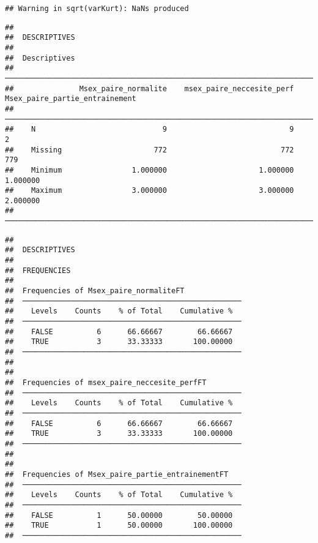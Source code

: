 \documentclass[
]{article}
\begin{document}
\begin{verbatim}
## Warning in sqrt(varKurt): NaNs produced
\end{verbatim}

\begin{verbatim}
## 
##  DESCRIPTIVES
## 
##  Descriptives                                                                                       
##  ────────────────────────────────────────────────────────────────────────────────────────────────── 
##               Msex_paire_normalite    msex_paire_neccesite_perf    Msex_paire_partie_entrainement   
##  ────────────────────────────────────────────────────────────────────────────────────────────────── 
##    N                             9                            9                                 2   
##    Missing                     772                          772                               779   
##    Minimum                1.000000                     1.000000                          1.000000   
##    Maximum                3.000000                     3.000000                          2.000000   
##  ──────────────────────────────────────────────────────────────────────────────────────────────────
\end{verbatim}

\begin{verbatim}
## 
##  DESCRIPTIVES
## 
##  FREQUENCIES
## 
##  Frequencies of Msex_paire_normaliteFT              
##  ────────────────────────────────────────────────── 
##    Levels    Counts    % of Total    Cumulative %   
##  ────────────────────────────────────────────────── 
##    FALSE          6      66.66667        66.66667   
##    TRUE           3      33.33333       100.00000   
##  ────────────────────────────────────────────────── 
## 
## 
##  Frequencies of msex_paire_neccesite_perfFT         
##  ────────────────────────────────────────────────── 
##    Levels    Counts    % of Total    Cumulative %   
##  ────────────────────────────────────────────────── 
##    FALSE          6      66.66667        66.66667   
##    TRUE           3      33.33333       100.00000   
##  ────────────────────────────────────────────────── 
## 
## 
##  Frequencies of Msex_paire_partie_entrainementFT    
##  ────────────────────────────────────────────────── 
##    Levels    Counts    % of Total    Cumulative %   
##  ────────────────────────────────────────────────── 
##    FALSE          1      50.00000        50.00000   
##    TRUE           1      50.00000       100.00000   
##  ──────────────────────────────────────────────────
\end{verbatim}
\end{document}
